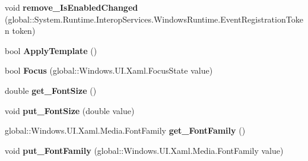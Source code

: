 \begin{DoxyCompactItemize}
\item 
\mbox{\label{interface_windows_1_1_u_i_1_1_xaml_1_1_controls_1_1_i_control_a9536f630fb699b5e3696f745e6f1fd92}} 
void {\bfseries remove\+\_\+\+Is\+Enabled\+Changed} (global\+::\+System.\+Runtime.\+Interop\+Services.\+Windows\+Runtime.\+Event\+Registration\+Token token)
\item 
\mbox{\label{interface_windows_1_1_u_i_1_1_xaml_1_1_controls_1_1_i_control_a68feca69bd9c95b33c4636574e86d05d}} 
bool {\bfseries Apply\+Template} ()
\item 
\mbox{\label{interface_windows_1_1_u_i_1_1_xaml_1_1_controls_1_1_i_control_a7c98017d582493146cd685fc022b8bcb}} 
bool {\bfseries Focus} (global\+::\+Windows.\+U\+I.\+Xaml.\+Focus\+State value)
\item 
\mbox{\label{interface_windows_1_1_u_i_1_1_xaml_1_1_controls_1_1_i_control_a9388b2d1fe635f428cae07d67c0a8aaf}} 
double {\bfseries get\+\_\+\+Font\+Size} ()
\item 
\mbox{\label{interface_windows_1_1_u_i_1_1_xaml_1_1_controls_1_1_i_control_a34a055aa84a0508191429e20453c5ce0}} 
void {\bfseries put\+\_\+\+Font\+Size} (double value)
\item 
\mbox{\label{interface_windows_1_1_u_i_1_1_xaml_1_1_controls_1_1_i_control_a689d7b84c03cb8baa86aef968c2f78e5}} 
global\+::\+Windows.\+U\+I.\+Xaml.\+Media.\+Font\+Family {\bfseries get\+\_\+\+Font\+Family} ()
\item 
\mbox{\label{interface_windows_1_1_u_i_1_1_xaml_1_1_controls_1_1_i_control_a9026d2ca28dbe0834360260903186536}} 
void {\bfseries put\+\_\+\+Font\+Family} (global\+::\+Windows.\+U\+I.\+Xaml.\+Media.\+Font\+Family value)
\item 
\mbox{\label{interface_windows_1_1_u_i_1_1_xaml_1_1_controls_1_1_i_control_a72747904d83bab3de0891c213aa46602}} 

\end{DoxyCompactItemize}
